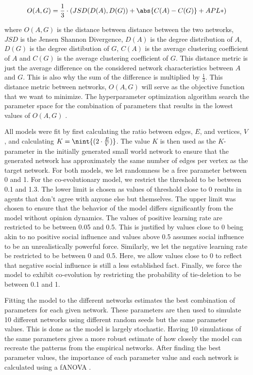 \documentclass{article}
\DeclarePairedDelimiter{\nint}\lfloor\rceil
\DeclarePairedDelimiter{\abs}\lvert\rvert
\begin{document}
$$ O(A, G) = \frac{1}{3} \cdot \left(JSD(D(A), D(G)) + \abs{C(A) - C(G)} + APL*\right)$$

where $O(A, G)$ is the distance between distance between the two networks, $JSD$ is the Jensen Shannon Divergence, $D(A)$ is the degree distribution of $A$, $D(G)$ is the degree distibution of $G$, $C(A)$ is the average clustering coefficient of $A$ and $C(G)$ is the average clustering coefficient of $G$. This distance metric is just the average difference on the considered network characteristics between $A$ and $G$. This is also why the sum of the difference is multiplied by $\frac{1}{3}$. This distance metric between networks, $O(A, G)$ will serve as the objective function that we want to minimize. The hyperparameter optimization algorithm search the parameter space for the combination of parameters that results in the lowest values of $O(A, G)$ \cite{akiba_optuna_2019,wu_hyperparameter_2019}.

All models were fit by first calculating the ratio between edges, $E$, and vertices, $V$, and calculating $K = \nint{(2 \cdot \frac{E}{V})}$. The value $K$ is then used as the $K$-parameter in the initially generated small world network to ensure that the generated network has approximately the same number of edges per vertex as the target network. 
For both models, we let randomness be a free parameter between 0 and 1. For the co-evolutionary model, we restrict the threshold to be between 0.1 and 1.3. The lower limit is chosen as values of threshold close to 0 results in agents that don’t agree with anyone else but themselves. The upper limit was chosen to ensure that the behavior of the model differs significantly from the model without opinion dynamics. 
The values of positive learning rate are restricted to be between 0.05 and 0.5. This is justified by values close to 0 being akin to no positive social influence and values above 0.5 assumes social influence to be an unrealistically powerful force. Similarly, we let the negative learning rate be restricted to be between 0 and 0.5. Here, we allow values close to 0 to reflect that negative social influence is still a less established fact. Finally, we force the model to exhibit co-evolution by restricting the probability of tie-deletion to be between 0.1 and 1. 

Fitting the model to the different networks estimates the best combination of parameters for each given network. These parameters are then used to simulate 10 different networks using different random seeds but the same parameter values. This is done as the model is largely stochastic. Having 10 simulations of the same parameters gives a more robust estimate of how closely the model can recreate the patterns from the empirical networks.
After finding the best parameter values, the importance of each parameter value and each network is calculated using a fANOVA \cite{hutter2014efficient}. 
\end{document}
